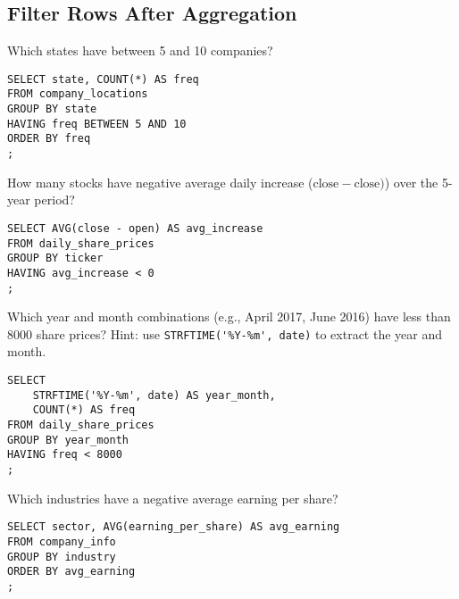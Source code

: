 \documentclass[10pt]{exam}
\begin{document}
\begin{questions}
\subsection*{Filter Rows After Aggregation}

\question Which states have between 5 and 10 companies?

\begin{solution}
\begin{lstlisting}
SELECT state, COUNT(*) AS freq
FROM company_locations
GROUP BY state
HAVING freq BETWEEN 5 AND 10
ORDER BY freq
;
\end{lstlisting}
\end{solution}


\question How many stocks have negative average daily increase ($\textrm{close}
- \textrm{close})$) over the 5-year period?

\begin{solution}
\begin{lstlisting}
SELECT AVG(close - open) AS avg_increase
FROM daily_share_prices
GROUP BY ticker
HAVING avg_increase < 0
;
\end{lstlisting}
\end{solution}


\question Which year and month combinations (e.g., April 2017, June 2016) have
less than 8000 share prices? Hint: use \lstinline{STRFTIME('%Y-%m', date)} to
extract the year and month.

\begin{solution}
\begin{lstlisting}
SELECT
	STRFTIME('%Y-%m', date) AS year_month,
	COUNT(*) AS freq
FROM daily_share_prices
GROUP BY year_month
HAVING freq < 8000
;
\end{lstlisting}
\end{solution}


\question Which industries have a negative average earning per share?

\begin{solution}
\begin{lstlisting}
SELECT sector, AVG(earning_per_share) AS avg_earning
FROM company_info
GROUP BY industry
ORDER BY avg_earning
;
\end{lstlisting}
\end{solution}



\end{questions}

\clearpage
\end{document}
